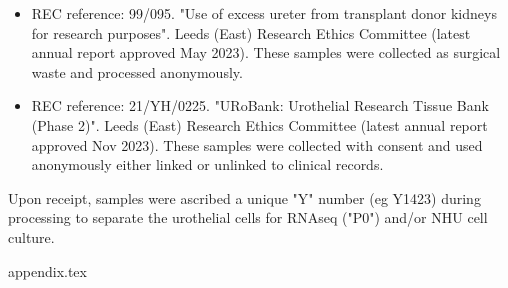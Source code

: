 \documentclass[a4paper, 12pt]{report}
\begin{document}
\begin{itemize}
    \item REC reference: 99/095. "Use of excess ureter from transplant donor kidneys for research purposes". Leeds (East) Research Ethics Committee (latest annual report approved May 2023). These samples were collected as surgical waste and processed anonymously.
    \item REC reference: 21/YH/0225. "URoBank: Urothelial Research Tissue Bank (Phase 2)". Leeds (East) Research Ethics Committee (latest annual report approved Nov 2023). These samples were collected with consent and used anonymously either linked or unlinked to clinical records.  
\end{itemize}

Upon receipt, samples were ascribed a unique "Y" number (eg Y1423) during processing to separate the urothelial cells for RNAseq ("P0") and/or NHU cell culture.

{appendix.tex}







\end{document}
